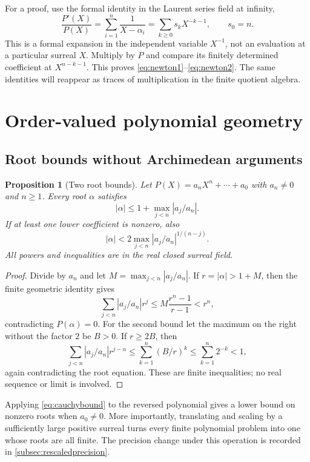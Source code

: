 \documentclass[11pt,letterpaper]{article}
\numberwithin{equation}{section}
\newtheorem{proposition}[proposition]{Proposition}
\theoremstyle{definition}
\theoremstyle{remark}
\begin{document}
For a proof, use the formal identity in the Laurent series field at
infinity,
\[
 \frac{P'(X)}{P(X)}=\sum_{i=1}^n\frac1{X-\alpha_i}
 =\sum_{k\ge0}s_kX^{-k-1},\qquad s_0=n.
\]
This is a formal expansion in the independent variable $X^{-1}$, not an
evaluation at a particular surreal $X$. Multiply by $P$ and compare its
finitely determined coefficient at $X^{n-k-1}$. This proves
\eqref{eq:newton1}--\eqref{eq:newton2}. The same identities will reappear as
traces of multiplication in the finite quotient algebra.

\section{Order-valued polynomial geometry}\label{sec:ordergeometry}

\subsection{Root bounds without Archimedean arguments}
\begin{proposition}[Two root bounds]\label{prop:rootbounds}
Let $P(X)=a_nX^n+\cdots+a_0$ with $a_n\ne0$ and $n\ge1$. Every root
$\alpha$ satisfies
\begin{equation}\label{eq:cauchybound}
 |\alpha|\le1+\max_{j<n}|a_j/a_n|.
\end{equation}
If at least one lower coefficient is nonzero, also
\begin{equation}\label{eq:scaledbound}
 |\alpha|<2\max_{j<n}|a_j/a_n|^{1/(n-j)}.
\end{equation}
All powers and inequalities are in the real closed surreal field.
\end{proposition}
\begin{proof}
Divide by $a_n$ and let $M=\max_{j<n}|a_j/a_n|$. If
$r=|\alpha|>1+M$, then the finite geometric identity gives
\[
 \sum_{j<n}|a_j/a_n|r^j
 \le M\frac{r^n-1}{r-1}<r^n,
\]
contradicting $P(\alpha)=0$. For the second bound let the maximum on the
right without the factor $2$ be $B>0$. If $r\ge2B$, then
\[
 \sum_{j<n}|a_j/a_n|r^{j-n}
 \le\sum_{k=1}^n(B/r)^k
 \le\sum_{k=1}^n2^{-k}<1,
\]
again contradicting the root equation. These are finite inequalities;
no real sequence or limit is involved.
\end{proof}

Applying \eqref{eq:cauchybound} to the reversed polynomial gives a lower
bound on nonzero roots when $a_0\ne0$. More importantly, translating and
scaling by a sufficiently large positive surreal turns every finite
polynomial problem into one whose roots are all finite. The precision
change under this operation is recorded in \cref{subsec:rescaledprecision}.
\end{document}
